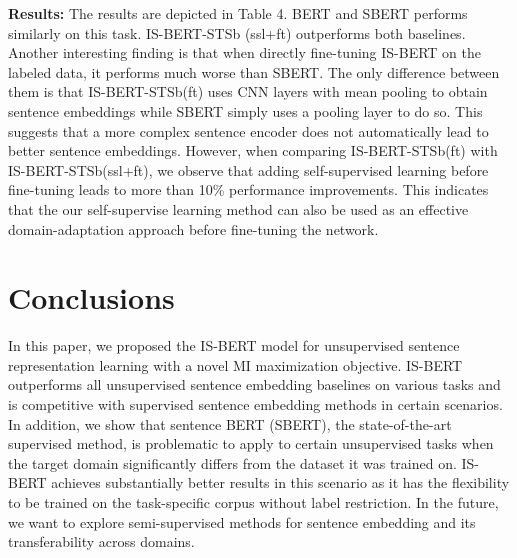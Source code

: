 \documentclass[11pt,a4paper]{article}
\begin{document}
\noindent\textbf{Results: } The results are depicted in Table 4. BERT and SBERT performs similarly on this task. IS-BERT-STSb (ssl+ft) outperforms both baselines. Another interesting finding is that when directly fine-tuning IS-BERT on the labeled data, it performs much worse than SBERT. The only difference between them is that IS-BERT-STSb(ft) uses CNN layers with mean pooling to obtain sentence embeddings while SBERT simply uses a pooling layer to do so. This suggests that a more complex sentence encoder does not 
automatically lead to better sentence embeddings. However, when comparing IS-BERT-STSb(ft) with IS-BERT-STSb(ssl+ft), we observe that adding self-supervised learning before fine-tuning leads to more than 10\% performance improvements. This indicates that the our self-supervise learning method can also be used as an effective domain-adaptation approach before fine-tuning the network. 



 \section{Conclusions}

In this paper, we proposed the IS-BERT model for unsupervised sentence representation learning with a novel MI maximization objective. IS-BERT outperforms all unsupervised sentence embedding baselines on various tasks and is competitive with supervised sentence embedding methods in certain scenarios. In addition, we show that sentence BERT (SBERT), the state-of-the-art supervised method, is problematic to apply to certain unsupervised tasks when the target domain significantly differs from the dataset it was trained on. IS-BERT achieves substantially better results in this scenario as it has the flexibility to be trained on the task-specific corpus without label restriction. In the future, we want to explore semi-supervised methods for sentence embedding and its transferability across domains.  


\end{document}
